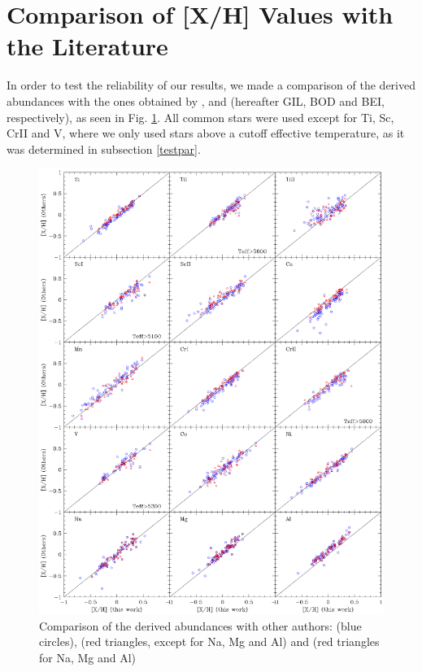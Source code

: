 \documentclass[dvips,12pt,a4paper]{report}
\begin{document}
{{\section{Comparison of [X/H] Values with the Literature}

In order to test the reliability of our results, we made a comparison of the derived abundances with the ones obtained by \citet{Gilli-2006}, \citet{Bodaghee-2003} and \citet{Beirao-2005} (hereafter GIL, BOD and BEI, respectively), as seen in Fig. \ref{gfxcomparison}. All common stars were used except for Ti, Sc, CrII and V, where we only used stars above a cutoff effective temperature, as it was determined in subsection \ref{testpar}.

\begin{figure}[h!]
\centering
\includegraphics[trim=0cm 1cm 0cm 1cm,clip,width=15 cm]{pics/parte4/comp.eps}
\caption[Comparison of abundances with other authors]{Comparison of the derived abundances with other authors: \citet{Gilli-2006} (blue circles), \citet{Bodaghee-2003} (red triangles, except for Na, Mg and Al) and \citet{Beirao-2005} (red triangles for Na, Mg and Al)  }
\label{gfxcomparison}
\end{figure}



}}
\end{document}
